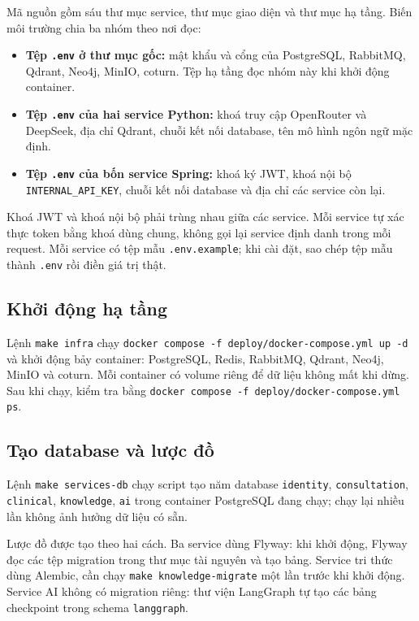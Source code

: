 Mã nguồn gồm sáu thư mục service, thư mục giao diện và thư mục hạ tầng. Biến môi trường chia ba nhóm theo nơi đọc:

\begin{itemize}
  \item \textbf{Tệp \texttt{.env} ở thư mục gốc:} mật khẩu và cổng của PostgreSQL, RabbitMQ, Qdrant, Neo4j, MinIO, coturn. Tệp hạ tầng đọc nhóm này khi khởi động container.
  \item \textbf{Tệp \texttt{.env} của hai service Python:} khoá truy cập OpenRouter và DeepSeek, địa chỉ Qdrant, chuỗi kết nối database, tên mô hình ngôn ngữ mặc định.
  \item \textbf{Tệp \texttt{.env} của bốn service Spring:} khoá ký JWT, khoá nội bộ \texttt{INTERNAL\_API\_KEY}, chuỗi kết nối database và địa chỉ các service còn lại.
\end{itemize}

Khoá JWT và khoá nội bộ phải trùng nhau giữa các service. Mỗi service tự xác thực token bằng khoá dùng chung, không gọi lại service định danh trong mỗi request. Mỗi service có tệp mẫu \texttt{.env.example}; khi cài đặt, sao chép tệp mẫu thành \texttt{.env} rồi điền giá trị thật.

\subsection{Khởi động hạ tầng}

Lệnh \texttt{make infra} chạy \texttt{docker compose -f deploy/docker-compose.yml up -d} và khởi động bảy container: PostgreSQL, Redis, RabbitMQ, Qdrant, Neo4j, MinIO và coturn. Mỗi container có volume riêng để dữ liệu không mất khi dừng. Sau khi chạy, kiểm tra bằng \texttt{docker compose -f deploy/docker-compose.yml ps}.

\subsection{Tạo database và lược đồ}

Lệnh \texttt{make services-db} chạy script tạo năm database \texttt{identity}, \texttt{consultation}, \texttt{clinical}, \texttt{knowledge}, \texttt{ai} trong container PostgreSQL đang chạy; chạy lại nhiều lần không ảnh hưởng dữ liệu có sẵn.

Lược đồ được tạo theo hai cách. Ba service dùng Flyway: khi khởi động, Flyway đọc các tệp migration trong thư mục tài nguyên và tạo bảng. Service tri thức dùng Alembic, cần chạy \texttt{make knowledge-migrate} một lần trước khi khởi động. Service AI không có migration riêng: thư viện LangGraph tự tạo các bảng checkpoint trong schema \texttt{langgraph}.

